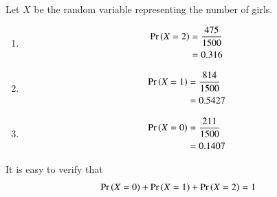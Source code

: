 Let $X$ be the random variable representing the number of girls.
\begin{enumerate}
\item 
\begin{align}
\Pr\left(X = 2\right)&= \frac{475}{1500}
\\
&= 0.316
\end{align}
\item 
\begin{align}
\Pr\left(X = 1\right)&=  \frac{814}{1500}
\\
&= 0.5427
\end{align} 
\item 
\begin{align}
\Pr\left(X = 0\right)&= \frac{211}{1500}
\\
&= 0.1407
\end{align} 
\end{enumerate}
It is easy to verify that 
\begin{align}
\Pr\left(X = 0\right)+ \Pr\left(X = 1\right) + \Pr\left(X = 2\right) = 1
\end{align}
